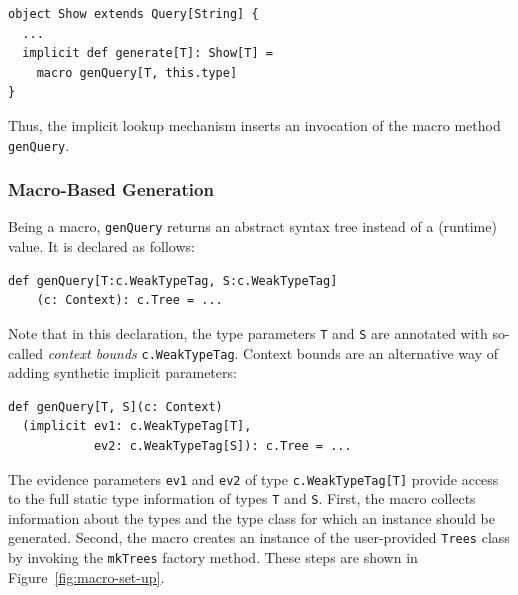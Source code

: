\documentclass[preprint,nocopyrightspace]{sigplanconf}
\begin{document}
\begin{lstlisting}
object Show extends Query[String] {
  ...
  implicit def generate[T]: Show[T] =
    macro genQuery[T, this.type]
}
\end{lstlisting}
\noindent
Thus, the implicit lookup mechanism inserts an invocation of the macro method
\verb|genQuery|.

\subsubsection{Macro-Based Generation}
\label{sec:macro-based-generation}

Being a macro, \verb|genQuery| returns an abstract syntax
tree instead of a (runtime) value. It is declared as follows:

\begin{lstlisting}
def genQuery[T:c.WeakTypeTag, S:c.WeakTypeTag]
    (c: Context): c.Tree = ...
\end{lstlisting}
\noindent
Note that in this declaration, the type parameters \verb|T| and \verb|S| are annotated with
so-called \emph{context bounds} \verb|c.WeakTypeTag|. Context bounds are an
alternative way of adding synthetic implicit parameters:

\begin{lstlisting}
def genQuery[T, S](c: Context)
  (implicit ev1: c.WeakTypeTag[T],
            ev2: c.WeakTypeTag[S]): c.Tree = ...
\end{lstlisting}
\noindent
The evidence parameters \verb|ev1| and \verb|ev2| of type \verb|c.WeakTypeTag[T]| provide
access to the full static type information of types \verb|T| and \verb|S|.
First, the macro collects information about the types and the type
class for which an instance should be generated. Second, the macro creates an
instance of the user-provided \verb|Trees| class by invoking the
\verb|mkTrees| factory method. These steps are shown in Figure~\ref{fig:macro-set-up}.
\end{document}
